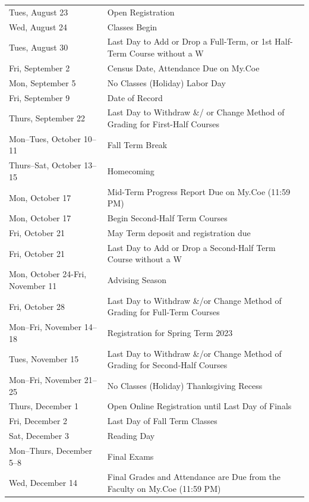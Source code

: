 \documentclass[
  letterpaper,
]{scrbook}
\renewcommand\toprule[2]\relax
\renewcommand\bottomrule[2]\relax
\begin{document}
\begin{longtable}[]{@{}
  >{\raggedright\arraybackslash}p{}
  >{\raggedleft\arraybackslash}p{}@{}}
\toprule\noalign{}
\endhead
\bottomrule\noalign{}
\endlastfoot
Tues, August 23 & Open Registration \\
Wed, August 24 & Classes Begin \\
Tues, August 30 & Last Day to Add or Drop a Full-Term, or 1st Half-Term
Course without a W \\
Fri, September 2 & Census Date, Attendance Due on My.Coe \\
Mon, September 5 & No Classes (Holiday) Labor Day \\
Fri, September 9 & Date of Record \\
Thurs, September 22 & Last Day to Withdraw \&/ or Change Method of
Grading for First-Half Courses \\
Mon--Tues, October 10--11 & Fall Term Break \\
Thurs--Sat, October 13--15 & Homecoming \\
Mon, October 17 & Mid-Term Progress Report Due on My.Coe (11:59 PM) \\
Mon, October 17 & Begin Second-Half Term Courses \\
Fri, October 21 & May Term deposit and registration due \\
Fri, October 21 & Last Day to Add or Drop a Second-Half Term Course
without a W \\
Mon, October 24-Fri, November 11 & Advising Season \\
Fri, October 28 & Last Day to Withdraw \&/or Change Method of Grading
for Full-Term Courses \\
Mon--Fri, November 14--18 & Registration for Spring Term 2023 \\
Tues, November 15 & Last Day to Withdraw \&/or Change Method of Grading
for Second-Half Courses \\
Mon--Fri, November 21--25 & No Classes (Holiday) Thanksgiving Recess \\
Thurs, December 1 & Open Online Registration until Last Day of Finals \\
Fri, December 2 & Last Day of Fall Term Classes \\
Sat, December 3 & Reading Day \\
Mon--Thurs, December 5--8 & Final Exams \\
Wed, December 14 & Final Grades and Attendance are Due from the Faculty
on My.Coe (11:59 PM) \\
\end{longtable}
\end{document}
